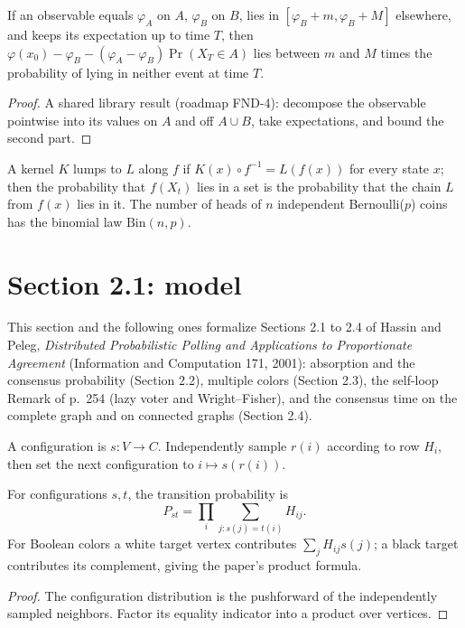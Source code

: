\begin{theorem}\label{thm:optional-stopping}
\leanok{}
If an observable equals $\varphi_A$ on $A$, $\varphi_B$ on $B$, lies in
$[\varphi_B+m,\varphi_B+M]$ elsewhere, and keeps its expectation up to time $T$, then
$\varphi(x_0)-\varphi_B-(\varphi_A-\varphi_B)\Pr(X_T\in A)$ lies between $m$ and $M$
times the probability of lying in neither event at time $T$.
\end{theorem}
\begin{proof}\leanok
A shared library result (roadmap FND-4): decompose the observable pointwise into its values
on $A$ and off $A\cup B$, take expectations, and bound the second part.
\end{proof}

\begin{definition}\label{def:lumps-shared}
\leanok
A kernel $K$ lumps to $L$ along $f$ if $K(x)\circ f^{-1}=L(f(x))$ for every state $x$; then the
probability that $f(X_t)$ lies in a set is the probability that the chain $L$ from $f(x)$ lies in
it. The number of heads of $n$ independent Bernoulli($p$) coins has the binomial law
$\mathrm{Bin}(n,p)$.
\end{definition}

\section{Section 2.1: model}\label{sec:hassin-peleg}
This section and the following ones formalize Sections 2.1 to 2.4 of Hassin and Peleg,
\emph{Distributed Probabilistic Polling and Applications to Proportionate Agreement}
(Information and Computation 171, 2001): absorption and the consensus probability (Section 2.2),
multiple colors (Section 2.3), the self-loop Remark of p.~254 (lazy voter and Wright--Fisher),
and the consensus time on the complete graph and on connected graphs (Section 2.4).
\begin{definition}\label{def:step}
\leanok{}
A configuration is $s:V\to C$. Independently sample $r(i)$ according to row
$H_i$, then set the next configuration to $i\mapsto s(r(i))$.
\end{definition}
\begin{lemma}\label{lem:product}
\leanok{}
For configurations $s,t$, the transition probability is
\[P_{st}=\prod_i\sum_{j:s(j)=t(i)}H_{ij}.\]
For Boolean colors a white target vertex contributes $\sum_j H_{ij}s(j)$;
a black target contributes its complement, giving the paper's product formula.
\end{lemma}
\begin{proof}\leanok
The configuration distribution is the pushforward of the independently sampled
neighbors. Factor its equality indicator into a product over vertices.
\end{proof}

